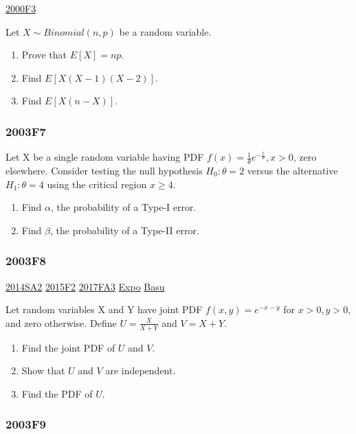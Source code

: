\documentclass[10pt,twocolumn,portrait]{article}
\begin{document}
\protect\hyperlink{f3}{2000F3}

Let \(X\sim Binomial(n,p)\) be a random variable.

\begin{enumerate}
\def\labelenumi{\Alph{enumi})}
\item
  Prove that \(E[X]=np\).
\item
  Find \(E[X(X-1)(X-2)]\).
\item
  Find \(E[X(n-X)]\).
\end{enumerate}

\hypertarget{f7-1}{%
\subsubsection{2003F7}\label{f7-1}}

Let X be a single random variable having PDF
\(f(x)=\frac1{\theta}e^{-\frac{x}{\theta}},x>0\), zero elsewhere.
Consider testing the null hypothesis \(H_0:\theta=2\) versus the
alternative \(H_1:\theta=4\) using the critical region \(x\ge4\).

\begin{enumerate}
\def\labelenumi{\Alph{enumi})}
\item
  Find \(\alpha\), the probability of a Type-I error.
\item
  Find \(\beta\), the probability of a Type-II error.
\end{enumerate}

\hypertarget{f8-1}{%
\subsubsection{2003F8}\label{f8-1}}

\protect\hyperlink{sa2-2}{2014SA2} \protect\hyperlink{f2-5}{2015F2}
\protect\hyperlink{fa3-3}{2017FA3} \protect\hyperlink{Expo}{Expo}
\protect\hyperlink{Basu}{Basu}

Let random variables X and Y have joint PDF \(f(x,y)=e^{-x-y}\) for
\(x>0,y>0\), and zero otherwise. Define \(U=\frac{X}{X+Y}\) and
\(V =X+Y\).

\begin{enumerate}
\def\labelenumi{\Alph{enumi})}
\item
  Find the joint PDF of \(U\) and \(V\).
\item
  Show that \(U\) and \(V\) are independent.
\item
  Find the PDF of \(U\).
\end{enumerate}

\hypertarget{f9-1}{%
\subsubsection{2003F9}\label{f9-1}}
\end{document}
